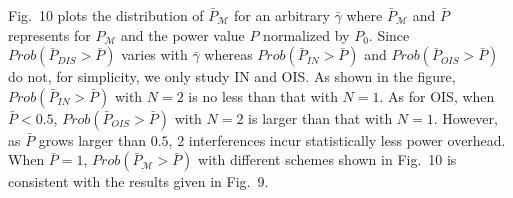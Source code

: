 \documentclass[10pt, conference, letterpaper]{IEEEtran}
\begin{document}

Fig.~10 plots the distribution of $\bar{P}_{\mathcal{M}}$
for an arbitrary $\bar{\gamma}$ where
$\bar{P}_{\mathcal{M}}$ and $\bar{P}$ represents for
$P_\mathcal{M}$ and
the power value $P$ normalized by $P_{0}$.
Since $Prob(\bar{P}_{DIS}>\bar{P})$ varies with $\bar{\gamma}$ whereas
$Prob(\bar{P}_{IN}>\bar{P})$ and $Prob(\bar{P}_{OIS}>\bar{P})$ do not, for simplicity,
we only study IN and OIS.
As shown in the figure, $Prob(\bar{P}_{IN}>\bar{P})$ with $N=2$ is no less than that with $N=1$.
As for OIS, when $\bar{P}<0.5$, $Prob(\bar{P}_{OIS}>\bar{P})$ with $N=2$
is larger than that with $N=1$. However, as $\bar{P}$ grows larger than $0.5$,
$2$ interferences incur statistically less power overhead.
When $\bar{P}=1$, $Prob(\bar{P}_{\mathcal{M}}>\bar{P})$ with different schemes
shown in Fig.~10 is consistent with the results given in Fig.~9.
%
\end{document}
